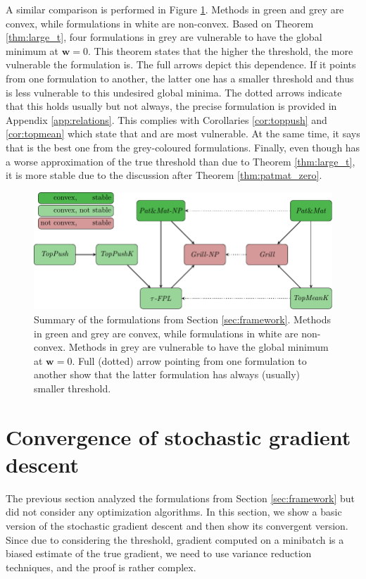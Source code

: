 A similar comparison is performed in Figure \ref{fig:thresholds}. Methods in green and grey are convex, while formulations in white are non-convex. Based on Theorem \ref{thm:large_t}, four formulations in grey are vulnerable to have the global minimum at $\bm{w}=0$. This theorem states that the higher the threshold, the more vulnerable the formulation is. The full arrows depict this dependence. If it points from one formulation to another, the latter one has a smaller threshold and thus is less vulnerable to this undesired global minima. The dotted arrows indicate that this holds usually but not always, the precise formulation is provided in Appendix \ref{app:relations}. This complies with Corollaries \ref{cor:toppush} and \ref{cor:topmean} which state that \TopPush and \TopMeanK are most vulnerable. At the same time, it says that \tauFPL is the best one from the grey-coloured formulations. Finally, even though \PatMatNP has a worse approximation of the true threshold than \tauFPL due to Theorem \ref{thm:large_t}, it is more stable due to the discussion after Theorem \ref{thm:patmat_zero}.

\begin{figure}[!ht]
  \centering
  \includegraphics[width = \linewidth]{images/methods_relation.pdf}
  \caption{Summary of the formulations from Section \ref{sec:framework}. Methods in green and grey are convex, while formulations in white are non-convex. Methods in grey are vulnerable to have the global minimum at $\bm{w}=0$. Full (dotted) arrow pointing from one formulation to another show that the latter formulation has always (usually) smaller threshold.}
  \label{fig:thresholds}
\end{figure}

\section{Convergence of stochastic gradient descent}\label{sec:convergence}

The previous section analyzed the formulations from Section \ref{sec:framework} but did not consider any optimization algorithms. In this section, we show a basic version of the stochastic gradient descent and then show its convergent version. Since due to considering the threshold, gradient computed on a minibatch is a biased estimate of the true gradient, we need to use variance reduction techniques, and the proof is rather complex.

